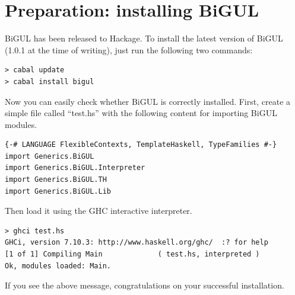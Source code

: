 
\section{Preparation: installing BiGUL}
\label{sec:install}

BiGUL has been released to Hackage.
To install the latest version of BiGUL (1.0.1 at the time of writing), just run the following two commands:
\begin{verbatim}
> cabal update
> cabal install bigul
\end{verbatim}

Now you can easily check whether BiGUL is correctly installed.
First, create a simple file called ``test.hs'' with the following 
content for importing BiGUL modules.
\begin{verbatim}
{-# LANGUAGE FlexibleContexts, TemplateHaskell, TypeFamilies #-}
import Generics.BiGUL
import Generics.BiGUL.Interpreter
import Generics.BiGUL.TH
import Generics.BiGUL.Lib
\end{verbatim}
Then load it using the GHC interactive interpreter.
\begin{verbatim}
> ghci test.hs
GHCi, version 7.10.3: http://www.haskell.org/ghc/  :? for help
[1 of 1] Compiling Main             ( test.hs, interpreted )
Ok, modules loaded: Main.
\end{verbatim}

If you see the above message, congratulations on your successful installation.


